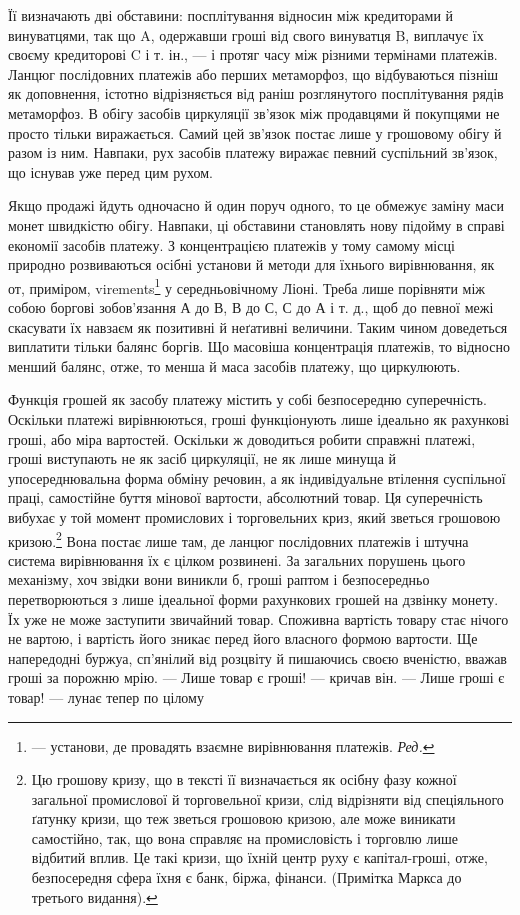 Її визначають дві обставини: посплітування відносин між кредиторами й винуватцями, так що A,
одержавши гроші від свого винуватця B, виплачує їх своєму кредиторові C і т. ін., — і протяг часу
між різними термінами платежів. Ланцюг послідовних платежів або перших метаморфоз, що відбуваються
пізніш як доповнення, істотно відрізняється від раніш розглянутого посплітування рядів метаморфоз. В
обігу засобів циркуляції зв’язок між продавцями й покупцями не просто тільки виражається. Самий цей
зв’язок постає лише у грошовому обігу й разом із ним. Навпаки, рух засобів платежу виражає певний
суспільний зв’язок, що існував уже перед цим рухом.

Якщо продажі йдуть одночасно й один поруч одного, то це обмежує заміну маси монет швидкістю обігу.
Навпаки, ці обставини становлять нову підойму в справі економії засобів платежу. З концентрацією
платежів у тому самому місці природно розвиваються осібні установи й методи для їхнього
вирівнювання, як от, приміром, virements\footnote*{
— установи, де провадять взаємне вирівнювання платежів. \emph{Ред.}
} у середньовічному Ліоні. Треба лише порівняти між собою
боргові зобов’язання А до В, В до С, С до А і т. д., щоб до певної межі скасувати їх навзаєм як
позитивні й неґативні величини. Таким чином доведеться виплатити тільки балянс боргів. Що масовіша
концентрація платежів, то відносно менший балянс, отже, то менша й маса засобів платежу, що
циркулюють.

Функція грошей як засобу платежу містить у собі безпосередню суперечність. Оскільки платежі
вирівнюються, гроші функціонують лише ідеально як рахункові гроші, або міра вартостей. Оскільки ж
доводиться робити справжні платежі, гроші
виступають не як засіб циркуляції, не як лише минуща й упосереднювальна форма обміну речовин, а як
індивідуальне втілення суспільної праці, самостійне буття мінової вартости, абсолютний товар. Ця
суперечність вибухає у той момент промислових і торговельних криз, який зветься грошовою кризою.\footnote{
Цю грошову кризу, що в тексті її визначається як осібну фазу кожної загальної промислової й
торговельної кризи, слід відрізняти від спеціяльного ґатунку кризи, що теж зветься грошовою кризою,
але може виникати самостійно, так, що вона справляє на промисловість і торговлю лише відбитий вплив.
Це такі кризи, що їхній центр руху є капітал-гроші, отже, безпосередня сфера їхня є банк, біржа,
фінанси. (Примітка Маркса до третього видання).
}
Вона постає лише там, де ланцюг послідовних платежів і штучна система вирівнювання їх є цілком
розвинені. За загальних порушень цього механізму, хоч звідки вони виникли б, гроші раптом і
безпосередньо перетворюються з лише ідеальної форми рахункових грошей на дзвінку монету. Їх уже не
може заступити звичайний товар. Споживна вартість товару стає нічого не вартою, і вартість його
зникає перед його власного формою вартости. Ще напередодні буржуа, сп’янілий від розцвіту й
пишаючись своєю вченістю, вважав гроші за порожню мрію. — Лише товар є гроші! — кричав він. — Лише
гроші є товар! — лунає тепер по цілому